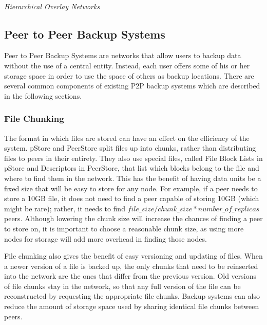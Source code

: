 \documentclass[a4paper]{article}
\begin{document}
\hfill \\
\textit{Hierarchical Overlay Networks}
\hfill \\

\subsection{Peer to Peer Backup Systems}
Peer to Peer Backup Systems are networks that allow users to backup data without the use of a central entity. Instead, each user offers some of his or her storage space in order to use the space of others as backup locations. There are several common components of existing P2P backup systems which are described in the following sections.

\subsubsection{File Chunking}
The format in which files are stored can have an effect on the efficiency of the system. pStore and PeerStore split files up into chunks, rather than distributing files to peers in their entirety. They also use special files, called File Block Lists in pStore and Descriptors in PeerStore, that list which blocks belong to the file and where to find them in the network. This has the benefit of having data units be a fixed size that will be easy to store for any node. For example, if a peer needs to store a 10GB file, it does not need to find a peer capable of storing 10GB (which might be rare); rather, it needs to find $file\_size/chunk\_size*number\_of\_replicas$ peers. Although lowering the chunk size will increase the chances of finding a peer to store on, it is important to choose a reasonable chunk size, as using more nodes for storage will add more overhead in finding those nodes.

File chunking also gives the benefit of easy versioning and updating of files. When a newer version of a file is backed up, the only chunks that need to be reinserted into the network are the ones that differ from the previous version. Old versions of file chunks stay in the network, so that any full version of the file can be reconstructed by requesting the appropriate file chunks. Backup systems can also reduce the amount of storage space used by sharing identical file chunks between peers.
\end{document}
